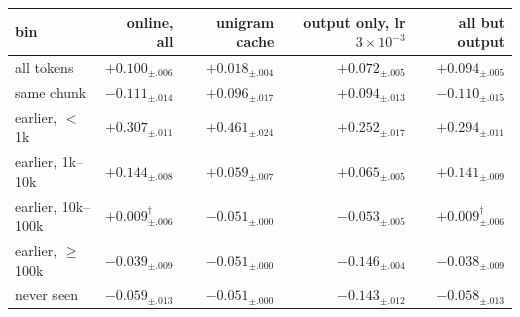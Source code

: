 \begin{tabular}{lrrrr}
\toprule
bin & online, all & unigram cache & output only, lr $3\!\times\!10^{-3}$ & all but output \\
\midrule
all tokens & $+0.100_{\pm .006}$ & $+0.018_{\pm .004}$ & $+0.072_{\pm .005}$ & $+0.094_{\pm .005}$ \\
same chunk & $-0.111_{\pm .014}$ & $+0.096_{\pm .017}$ & $+0.094_{\pm .013}$ & $-0.110_{\pm .015}$ \\
earlier, $<$ 1k & $+0.307_{\pm .011}$ & $+0.461_{\pm .024}$ & $+0.252_{\pm .017}$ & $+0.294_{\pm .011}$ \\
earlier, 1k--10k & $+0.144_{\pm .008}$ & $+0.059_{\pm .007}$ & $+0.065_{\pm .005}$ & $+0.141_{\pm .009}$ \\
earlier, 10k--100k & $+0.009_{\pm .006}^{\dagger}$ & $-0.051_{\pm .000}$ & $-0.053_{\pm .005}$ & $+0.009_{\pm .006}^{\dagger}$ \\
earlier, $\geq$ 100k & $-0.039_{\pm .009}$ & $-0.051_{\pm .000}$ & $-0.146_{\pm .004}$ & $-0.038_{\pm .009}$ \\
never seen & $-0.059_{\pm .013}$ & $-0.051_{\pm .000}$ & $-0.143_{\pm .012}$ & $-0.058_{\pm .013}$ \\
\bottomrule
\end{tabular}
